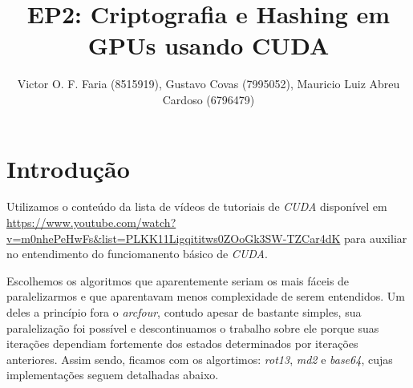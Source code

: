 \documentclass[final,12pt,a4paper]{elsarticle}
\begin{document}
\begin{frontmatter}


\title{EP2: Criptografia e Hashing em GPUs usando CUDA}




\author{Victor O. F. Faria (8515919), Gustavo Covas (7995052), Mauricio Luiz Abreu Cardoso (6796479)}

\address{MAC 5742-0219 Introdução à Programação Concorrente, Paralela e Distribuída}

\end{frontmatter}


\section{Introdução}

Utilizamos o conteúdo da lista de vídeos de tutoriais de \textit{CUDA} disponível em \url{https://www.youtube.com/watch?v=m0nhePeHwFs&list=PLKK11Ligqititws0ZOoGk3SW-TZCar4dK} para auxiliar no entendimento do funciomanento básico de \textit{CUDA}.

Escolhemos os algoritmos que aparentemente seriam os mais fáceis de paralelizarmos e que aparentavam menos complexidade de serem entendidos. Um deles a princípio fora o \textit{arcfour}, contudo apesar de bastante simples, sua paralelização foi possível e descontinuamos o trabalho sobre ele porque suas iterações dependiam fortemente dos estados determinados por iterações anteriores. Assim sendo, ficamos com os algortimos: \textit{rot13}, \textit{md2} e \textit{base64}, cujas implementações seguem detalhadas abaixo.
\end{document}
